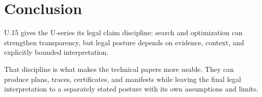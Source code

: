 \section{Conclusion}

U.15 gives the U-series its legal claim discipline: search and optimization can
strengthen transparency, but legal posture depends on evidence, context, and
explicitly bounded interpretation.

That discipline is what makes the technical papers more usable. They can
produce plans, traces, certificates, and manifests while leaving the final
legal interpretation to a separately stated posture with its own assumptions
and limits.
